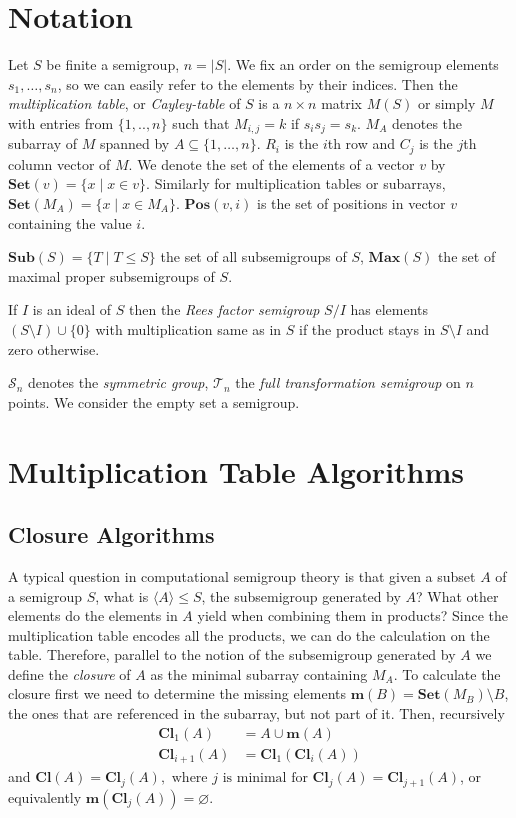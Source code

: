\documentclass{amsart}
\newcommand{\cT}{{\mathcal T}}
\newcommand{\cS}{{\mathcal S}}
\newcommand{\Sub}{\mathbf{Sub}}
\newcommand{\Set}{\mathbf{Set}}
\newcommand{\Miss}{\mathbf{m}}
\newcommand{\Closure}{\mathbf{Cl}}
\newcommand{\Pos}{\mathbf{Pos}}
\newcommand{\Max}{\mathbf{Max}}
\theoremstyle{plain}
\theoremstyle{definition}
\begin{document}
\section{Notation}
Let $S$ be finite a semigroup, $n=|S|$.
We fix an order on the semigroup elements $s_1,\ldots, s_n$, so we can easily refer to the elements by their indices. 
Then the  \emph{multiplication table}, or \emph{Cayley-table} of $S$ is a $n\times n$ matrix $M(S)$ or simply $M$ with entries from $\{1,..,n\}$ such that $M_{i,j}=k$ if $s_is_j=s_k$.
$M_A$ denotes the subarray of $M$ spanned by $A\subseteq\{1,\ldots,n\}$.
$R_i$ is the $i$th row and $C_j$ is the $j$th column vector of $M$.
We denote the set of the elements of a vector $v$ by $\Set(v)=\{x\mid x\in v\}$.
Similarly for multiplication tables or subarrays, $\Set(M_A)=\{x\mid x\in M_A\}$.
$\Pos(v,i)$ is the set of positions in vector $v$ containing the value $i$.

$\Sub(S)=\big\{T\mid T\leq S \big\}$ the set of all subsemigroups of $S$, $\Max(S)$ the set of maximal proper subsemigroups of $S$.

If $I$ is an ideal of $S$ then the \emph{Rees factor semigroup} $S/I$ has elements $(S\setminus I)\cup\{0\}$ with multiplication same as in $S$ if the product stays in $S\setminus I$ and zero otherwise.

$\cS_n$ denotes the \emph{symmetric group}, $\cT_n$ the \emph{full transformation semigroup} on $n$ points.
We consider the empty set a semigroup.

\section{Multiplication Table Algorithms}
\label{sec:multab}

\subsection{Closure Algorithms}
A typical question in computational semigroup theory is that given a subset $A$ of a semigroup $S$, what is $\langle A\rangle\leq S$,  the subsemigroup generated by $A$?
What other elements do the elements in $A$ yield when combining them in products?
Since the multiplication table encodes all the products, we can do the calculation on the table. 
Therefore, parallel to the notion of the subsemigroup generated by $A$ we define the \emph{closure} of $A$ as the minimal subarray containing $M_A$.
To calculate the closure first we need to determine the missing elements $\Miss(B)=\Set(M_B)\setminus B$, the ones that are referenced in the subarray, but not part of it.
Then, recursively
\begin{align*}
\Closure_1(A)&=A\cup\Miss(A)\\
\Closure_{i+1}(A)&=\Closure_1(\Closure_{i}(A))
\end{align*}
and
$ \Closure(A)=\Closure_j(A), \text{ where $j$ is minimal for }\Closure_j(A)=\Closure_{j+1}(A)$, or equivalently $\Miss(\Closure_j(A))=\varnothing$.
\end{document}
